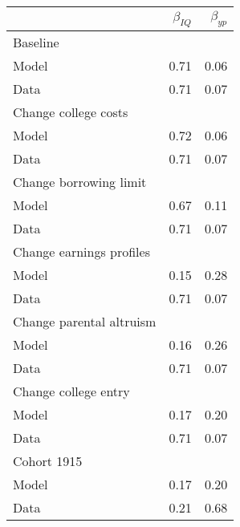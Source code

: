 \begin{tabular}{lrr}
\hline
  & $\beta_{IQ}$  & $\beta_{yp}$  \\ 
\hline
Baseline &   &   \\ 
Model & 0.71  & 0.06  \\ 
Data & 0.71  & 0.07  \\ 
Change college costs &   &   \\ 
Model & 0.72  & 0.06  \\ 
Data & 0.71  & 0.07  \\ 
Change borrowing limit &   &   \\ 
Model & 0.67  & 0.11  \\ 
Data & 0.71  & 0.07  \\ 
Change earnings profiles &   &   \\ 
Model & 0.15  & 0.28  \\ 
Data & 0.71  & 0.07  \\ 
Change parental altruism &   &   \\ 
Model & 0.16  & 0.26  \\ 
Data & 0.71  & 0.07  \\ 
Change college entry &   &   \\ 
Model & 0.17  & 0.20  \\ 
Data & 0.71  & 0.07  \\ 
Cohort 1915 &   &   \\ 
Model & 0.17  & 0.20  \\ 
Data & 0.21  & 0.68  \\ 
\hline
\end{tabular}%

